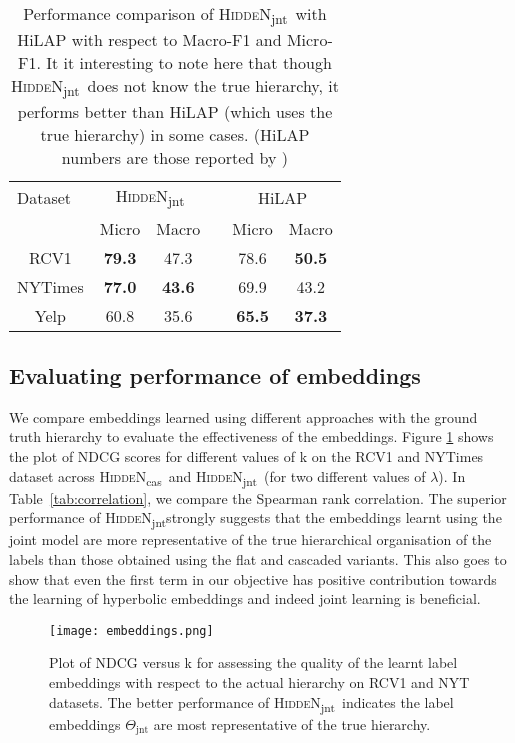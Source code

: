\documentclass[11pt,a4paper]{article}
\newcommand{\modeljnt}{\mbox{\textsc{HiddeN}\textsubscript{jnt}}}
\newcommand{\modelcas}{\mbox{\textsc{HiddeN}\textsubscript{cas}}}
\begin{document}
\begin{table}[!h]
\centering
\caption{Performance comparison of \modeljnt\ with HiLAP with respect to Macro-F1 and Micro-F1. It it interesting to note here that though \modeljnt\ does not know the true hierarchy, it performs better than HiLAP (which uses the true hierarchy) in some cases. (HiLAP numbers are those reported by \citet{emnlp})}
\label{tab:hilap}
\begin{adjustbox}{max width=0.48\textwidth}
\begin{tabular}{ccclcc} 
\toprule
\multicolumn{1}{l}{Dataset} & \multicolumn{2}{c}{\modeljnt} &  & \multicolumn{2}{c}{HiLAP} \\ 
\cline{2-3}\cline{5-6}
\multicolumn{1}{l}{} & \multicolumn{1}{l}{Micro} & \multicolumn{1}{l}{Macro} &  & Micro & Macro \\ 
\toprule
RCV1 & \textbf{79.3} & 47.3 &  & 78.6 & \textbf{50.5} \\
NYTimes & \textbf{77.0} & \textbf{43.6} &  & 69.9 & 43.2 \\
Yelp & 60.8 & 35.6 &  & \textbf{65.5} & \textbf{37.3} \\
\bottomrule
\end{tabular}
\end{adjustbox}
\end{table}

\subsection{Evaluating performance of embeddings}
We compare embeddings learned using different approaches with the ground truth hierarchy to evaluate the effectiveness of the embeddings. Figure \ref{fig:embed} shows the plot of NDCG scores for different values of k on the RCV1 and NYTimes dataset across \modelcas\ and \modeljnt\ (for two different values of $\lambda$). In Table~\ref{tab:correlation}, we compare the Spearman rank correlation. The superior performance of \modeljnt strongly suggests that the embeddings learnt using the joint model are more representative of the true hierarchical organisation of the labels than those obtained using the flat and cascaded variants. This also goes to show that even the first term in our objective has positive contribution towards the learning of hyperbolic embeddings and indeed joint learning is beneficial.

\begin{figure}[!h]
    \centering
    \texttt{[image: embeddings.png]}
    \caption{Plot of NDCG versus k for assessing the quality of the learnt label embeddings with respect to the actual hierarchy on RCV1 and NYT datasets. The better performance of \modeljnt\ indicates the label embeddings $\Theta_{\text{jnt}}$ are most representative of the true hierarchy.}
    \label{fig:embed}
\end{figure}
\end{document}
